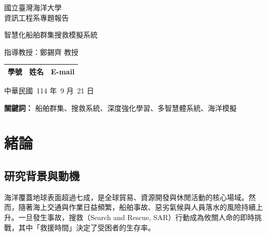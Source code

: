 \documentclass[12pt,a4paper]{ctexart}
\begin{document}
\begin{titlepage}

	\centering
	\vspace*{2cm}
	
	{\Large 國立臺灣海洋大學\\[0.5cm]資訊工程系專題報告 \par}
	
	\vspace*{1cm}
	{\Huge 智慧化船舶群集搜救模擬系統 \par}
	
	\vfill
	
	{\Large 指導教授：鄭錫齊 教授 \par}
	\vspace*{1cm}
	\begin{tabular}{lll}
	學號 & 姓名 & E-mail \\
	\hline
	\end{tabular}

	\vspace*{1cm}
	{\Large 中華民國\ 114 年\ 9 月\ 21 日 \par}

\end{titlepage}

\vspace*{0.3\textheight}
\begin{abstract}
海上搜救任務面臨著範圍廣闊、海象險惡、時間緊迫等嚴峻挑戰。為應對此一難題，本專案建構了一套「智慧化船舶群集搜救模擬系統」。系統核心旨在模擬並最佳化真實的搜救作業流程：首先，依據目標可能區域進行高效的網格化分割；接著，指揮調度多艘船隻構成的搜救群集，對各區塊展開平行搜索，以最大化覆蓋率並縮短搜尋時間。我們在 Unity 與 Crest 物理引擎打造的擬真海洋環境中，採用 SAC 深度強化學習演算法，賦予每艘搜救船隻在複雜風浪中自主執行精密搜索路徑、並規避動態障礙物的能力。本專案旨在評估此 AI 驅動的搜救群集，在不同搜救情境下，對於提升目標發現成功率、縮短搜救時間的實際成效，為未來智慧化海上應急響應系統提供關鍵的模擬驗證。
\end{abstract}

\centerline{\textbf{關鍵詞：} 船舶群集、搜救系統、深度強化學習、多智慧體系統、海洋模擬}

\newpage

\tableofcontents
\newpage

\section{緒論}

\subsection{研究背景與動機}
海洋覆蓋地球表面超過七成，是全球貿易、資源開發與休閒活動的核心場域。然而，隨著海上交通與作業日益頻繁，船舶事故、惡劣氣候與人員落水的風險持續上升。一旦發生事故，搜救（Search and Rescue, SAR）行動成為攸關人命的即時挑戰，其中「救援時間」決定了受困者的生存率。
\end{document}
